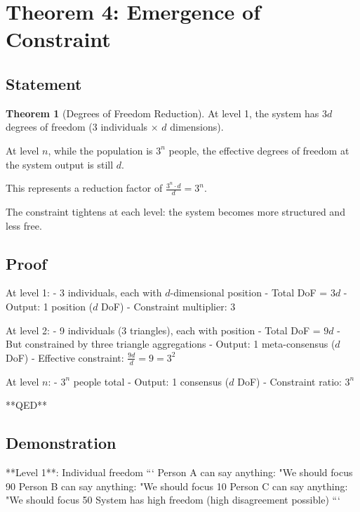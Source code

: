 \documentclass[12pt,a4paper]{article}
\theoremstyle{definition}
\newtheorem{theorem}{Theorem}[section]
\begin{document}
{%
\section{Theorem 4: Emergence of Constraint}

\subsection{Statement}

\begin{theorem}[Degrees of Freedom Reduction]
At level 1, the system has $3d$ degrees of freedom (3 individuals × $d$ dimensions).

At level $n$, while the population is $3^n$ people, the effective degrees of freedom at the system output is still $d$.

This represents a reduction factor of $\frac{3^n \cdot d}{d} = 3^n$.

The constraint tightens at each level: the system becomes more structured and less free.
\end{theorem}

\subsection{Proof}

At level 1:
- 3 individuals, each with $d$-dimensional position
- Total DoF = $3d$
- Output: 1 position ($d$ DoF)
- Constraint multiplier: $3$

At level 2:
- 9 individuals (3 triangles), each with position
- Total DoF = $9d$
- But constrained by three triangle aggregations
- Output: 1 meta-consensus ($d$ DoF)
- Effective constraint: $\frac{9d}{d} = 9 = 3^2$

At level $n$:
- $3^n$ people total
- Output: 1 consensus ($d$ DoF)
- Constraint ratio: $3^n$

**QED**

\subsection{Demonstration}

**Level 1**: Individual freedom
```
Person A can say anything: "We should focus 90%
Person B can say anything: "We should focus 10%
Person C can say anything: "We should focus 50%
System has high freedom (high disagreement possible)
```

}
\end{document}
